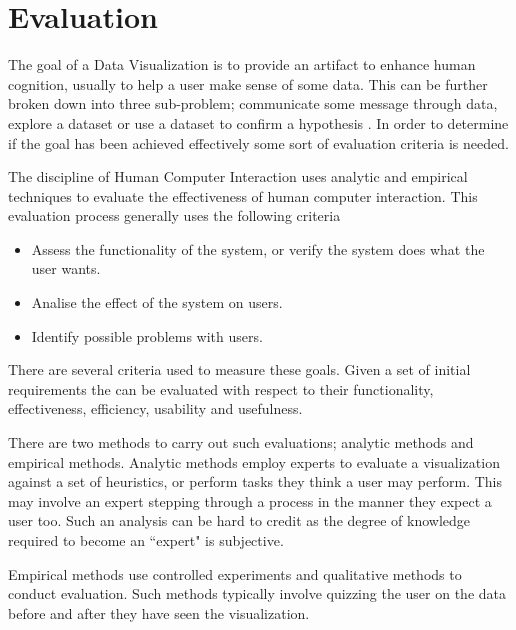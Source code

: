 \documentclass[a4paper, 10pt, titlepage, twocolumn, onehalfspace]{article}
\begin{document}
\section{Evaluation}
The goal of a Data Visualization is to provide an artifact to enhance human cognition, usually to help a user make sense of some data. This can be further broken down into three sub-problem; communicate some message through data, explore a dataset or use a dataset to confirm a hypothesis \cite{mazza2009introduction} . In order to determine if the goal has been achieved effectively some sort of evaluation criteria is needed. 

The discipline of Human Computer Interaction uses analytic and empirical techniques to evaluate the effectiveness of human computer interaction. This evaluation process generally uses the following criteria \cite{dix2004human}
\begin{itemize}
\item Assess the functionality of the system, or verify the system does what the user wants.
\item Analise the effect of the system on users.
\item Identify possible problems with users.
\end{itemize}
There are several criteria used to measure these goals. Given a set of initial requirements the can be evaluated with respect to their functionality, effectiveness, efficiency, usability and usefulness.

There are two methods to carry out such evaluations; analytic methods and empirical methods. Analytic methods employ experts to evaluate a visualization against a set of heuristics, or perform tasks they think a user may perform. This may involve an expert stepping through a process in the manner they expect a user too. Such an analysis can be hard to credit as the degree of knowledge required to become an ``expert" is subjective.

Empirical methods use controlled experiments and qualitative methods to conduct evaluation. Such methods typically involve quizzing the user on the data before and after they have seen the visualization.


\newpage


 


 
\end{document}
